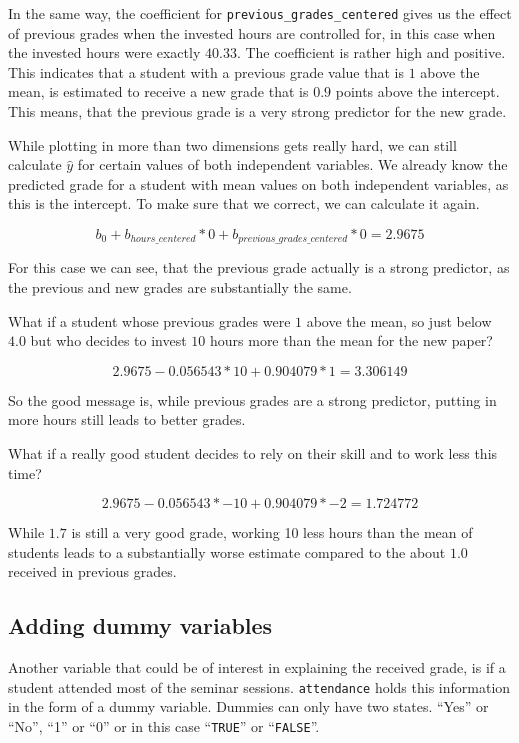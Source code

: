 \documentclass[
]{book}
\begin{document}
In the same way, the coefficient for \texttt{previous\_grades\_centered} gives us the
effect of previous grades when the invested hours are controlled for, in this
case when the invested hours were exactly \(40.33\). The coefficient is rather
high and positive. This indicates that a student with a previous grade value
that is \(1\) above the mean, is estimated to receive a new grade that is \(0.9\)
points above the intercept. This means, that the previous grade is a very strong
predictor for the new grade.

While plotting in more than two dimensions gets really hard, we can still
calculate \(\hat{y}\) for certain values of both independent variables.
We already know the predicted grade for a student with mean values on both
independent variables, as this is the intercept. To make sure that we correct,
we can calculate it again.

\[b_0 + b_{hours\_centered}*0 + b_{previous\_grades\_centered}*0 = 2.9675\]

For this case we can see, that the previous grade actually is a strong
predictor, as the previous and new grades are substantially the same.

What if a student whose previous grades were \(1\) above the mean, so just below
\(4.0\) but who decides to invest \(10\) hours more than the mean for the new paper?

\[2.9675 - 0.056543 * 10 + 0.904079 * 1 = 3.306149\]

So the good message is, while previous grades are a strong predictor, putting in
more hours still leads to better grades.

What if a really good student decides to rely on their skill and to work less
this time?

\[2.9675 - 0.056543 * -10 + 0.904079 * -2 = 1.724772\]

While \(1.7\) is still a very good grade, working 10 less hours than the mean of
students leads to a substantially worse estimate compared to the about \(1.0\)
received in previous grades.

\hypertarget{adding-dummy-variables}{%
\subsection{Adding dummy variables}\label{adding-dummy-variables}}

Another variable that could be of interest in explaining the received grade,
is if a student attended most of the seminar sessions.
\texttt{attendance} holds this information in the form of a dummy variable. Dummies can
only have two states. ``Yes'' or ``No'', ``1'' or ``0'' or in this case ``\texttt{TRUE}'' or
``\texttt{FALSE}''.
\end{document}
